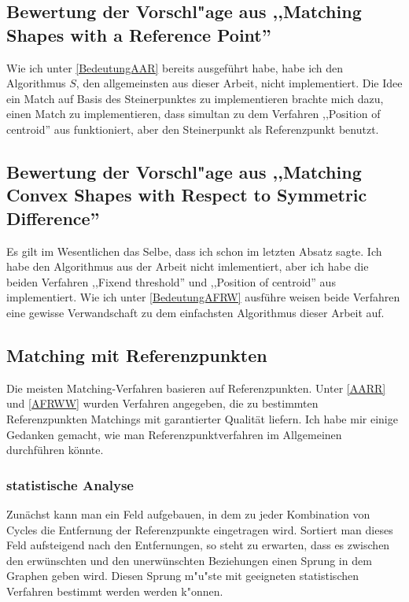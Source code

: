 \subsection[Bewertung der Vorschl"age aus \cite{AAR}]{Bewertung der Vorschl"age aus ,,Matching Shapes with a Reference Point'' \cite{AAR}}

Wie ich unter \ref{BedeutungAAR} bereits ausgeführt habe, habe ich den Algorithmus $S$, den allgemeinsten aus dieser Arbeit, nicht implementiert. Die Idee ein Match auf Basis des Steinerpunktes zu implementieren brachte mich dazu, einen Match zu implementieren, dass simultan zu dem Verfahren ,,Position of centroid'' aus \cite{TG} funktioniert, aber den Steinerpunkt als Referenzpunkt benutzt.

\subsection[Bewertung der Vorschl"age aus \cite{AFRW}]{Bewertung der Vorschl"age aus ,,Matching Convex Shapes with Respect to Symmetric Difference'' \cite{AFRW}}

Es gilt im Wesentlichen das Selbe, dass ich schon im letzten Absatz sagte. Ich habe den Algorithmus aus der Arbeit nicht imlementiert, aber ich habe die beiden Verfahren ,,Fixend threshold'' und ,,Position of centroid'' aus \cite{TG} implementiert. Wie ich unter \ref{BedeutungAFRW} ausführe weisen beide Verfahren  eine gewisse Verwandschaft zu dem einfachsten Algorithmus dieser Arbeit auf. 


\subsection{Matching mit Referenzpunkten}

Die meisten Matching-Verfahren basieren auf Referenzpunkten. Unter \ref{AARR} und \ref{AFRWW} wurden Verfahren angegeben, die zu bestimmten Referenzpunkten Matchings mit garantierter Qualität liefern. Ich habe mir einige Gedanken gemacht, wie man Referenzpunktverfahren im Allgemeinen durchführen könnte.

\subsubsection*{statistische Analyse}

Zunächst kann man ein Feld aufgebauen, in dem zu jeder Kombination von Cycles die Entfernung der Referenzpunkte eingetragen wird. Sortiert man dieses Feld aufsteigend nach den Entfernungen, so steht zu erwarten, dass es zwischen den erwünschten und den unerwünschten Beziehungen einen Sprung in dem Graphen geben wird.  Diesen Sprung m"u"ste mit geeigneten statistischen Verfahren bestimmt werden werden k"onnen. 

